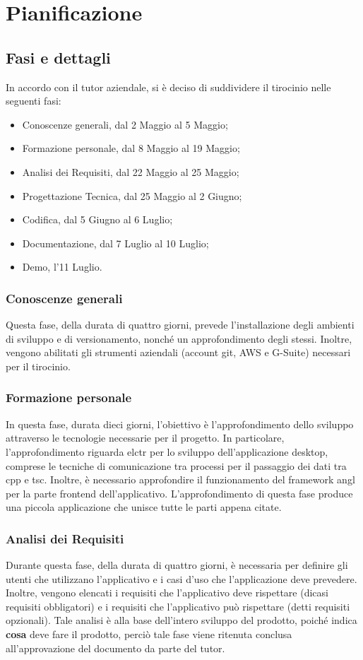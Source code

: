\section{Pianificazione}

\subsection{Fasi e dettagli}

In accordo con il tutor aziendale, si è deciso di suddividere il tirocinio nelle seguenti fasi:
\begin{itemize}
    \item Conoscenze generali, dal 2 Maggio al 5 Maggio;
    \item Formazione personale, dal 8 Maggio al 19 Maggio;
    \item Analisi dei Requisiti, dal 22 Maggio al 25 Maggio;
    \item Progettazione Tecnica, dal 25 Maggio al 2 Giugno;
    \item Codifica, dal 5 Giugno al 6 Luglio;
    \item Documentazione, dal 7 Luglio al 10 Luglio;
    \item Demo, l'11 Luglio.
\end{itemize}

\subsubsection{Conoscenze generali}
Questa fase, della durata di quattro giorni, prevede l'installazione degli ambienti di sviluppo e di versionamento, nonché un approfondimento degli stessi. Inoltre, vengono abilitati gli strumenti aziendali (account git, AWS e G-Suite) necessari per il tirocinio.
\subsubsection{Formazione personale}
In questa fase, durata dieci giorni, l'obiettivo è l'approfondimento dello sviluppo attraverso le tecnologie necessarie per il progetto.
In particolare, l'approfondimento riguarda \gls{elctr} per lo sviluppo dell'applicazione desktop, comprese le tecniche di comunicazione tra processi per il passaggio dei dati tra \gls{cpp} e \gls{tsc}. Inoltre, è necessario approfondire il funzionamento del framework \gls{angl} per la parte frontend dell'applicativo.
L'approfondimento di questa fase produce una piccola applicazione che unisce tutte le parti appena citate.
\subsubsection{Analisi dei Requisiti}
Durante questa fase, della durata di quattro giorni, è necessaria per definire gli utenti che utilizzano l'applicativo e i casi d'uso che l'applicazione deve prevedere.
Inoltre, vengono elencati i requisiti che l'applicativo deve rispettare (dicasi requisiti obbligatori) e i requisiti che l'applicativo può rispettare (detti requisiti opzionali).
Tale analisi è alla base dell'intero sviluppo del prodotto, poiché indica \textbf{cosa} deve fare il prodotto, perciò tale fase viene ritenuta conclusa all'approvazione del documento da parte del tutor.
